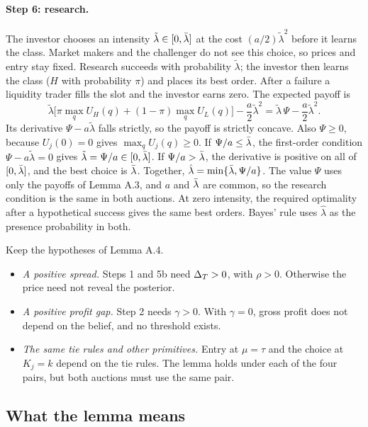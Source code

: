 \paragraph{Step 6: research.} The investor chooses an intensity \(\tilde\lambda\in[0,\bar\lambda]\) at the cost
\((a/2)\tilde\lambda^2\) before it learns the class. Market makers and the challenger do not see this choice, so
prices and entry stay fixed. Research succeeds with probability \(\tilde\lambda\); the investor then learns the
class (\(H\) with probability \(\pi\)) and places its best order. After a failure a liquidity trader fills the slot
and the investor earns zero. The expected payoff is
\[
\tilde\lambda\bigl[\pi\max_qU_H(q)+(1-\pi)\max_qU_L(q)\bigr]-\frac a2\tilde\lambda^2=\tilde\lambda\,\Psi-\frac a2\tilde\lambda^2 .
\]
Its derivative \(\Psi-a\tilde\lambda\) falls strictly, so the payoff is strictly concave. Also \(\Psi\ge0\), because
\(U_j(0)=0\) gives \(\max_qU_j(q)\ge0\). If \(\Psi/a\le\bar\lambda\), the first-order condition \(\Psi-a\tilde\lambda=0\)
gives \(\tilde\lambda=\Psi/a\in[0,\bar\lambda]\). If \(\Psi/a>\bar\lambda\), the derivative is positive on all of \([0,\bar\lambda]\), and
the best choice is \(\bar\lambda\). Together, \(\hat\lambda=\min\{\bar\lambda,\Psi/a\}\). The value \(\Psi\) uses only the payoffs of
Lemma A.3, and \(a\) and \(\bar\lambda\) are common, so the research condition is the same in both auctions. At zero
intensity, the required optimality after a hypothetical success gives the same best orders. Bayes' rule uses
\(\hat\lambda\) as the presence probability in both.

\begin{watchout}
Keep the hypotheses of Lemma A.4.
\begin{itemize}
\item \emph{A positive spread.} Steps 1 and 5b need \(\Delta_T>0\), with \(\rho>0\). Otherwise the price need not reveal
the posterior.
\item \emph{A positive profit gap.} Step 2 needs \(\gamma>0\). With \(\gamma=0\), gross profit does not depend on the
belief, and no threshold exists.
\item \emph{The same tie rules and other primitives.} Entry at \(\mu=\tau\) and the choice at \(K_j=k\) depend on
the tie rules. The lemma holds under each of the four pairs, but both auctions must use the same pair.
\end{itemize}
\end{watchout}

\subsection{What the lemma means}

